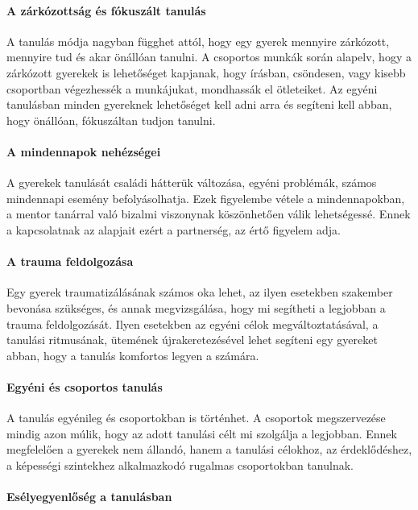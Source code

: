 \paragraph{A zárkózottság és fókuszált
tanulás}

A tanulás módja nagyban függhet attól, hogy egy gyerek mennyire
zárkózott, mennyire tud és akar önállóan tanulni. A csoportos munkák
során alapelv, hogy a zárkózott gyerekek is lehetőséget kapjanak, hogy
írásban, csöndesen, vagy kisebb csoportban végezhessék a munkájukat,
mondhassák el ötleteiket. Az egyéni tanulásban minden gyereknek
lehetőséget kell adni arra és segíteni kell abban, hogy önállóan,
fókuszáltan tudjon tanulni.

\paragraph{A mindennapok
nehézségei}

A gyerekek tanulását családi hátterük változása, egyéni problémák,
számos mindennapi esemény befolyásolhatja. Ezek figyelembe vétele a
mindennapokban, a mentor tanárral való bizalmi viszonynak köszönhetően
válik lehetségessé. Ennek a kapcsolatnak az alapjait ezért a partnerség,
az értő figyelem adja.

\paragraph{A trauma feldolgozása}

Egy gyerek traumatizálásának számos oka lehet, az ilyen esetekben
szakember bevonása szükséges, és annak megvizsgálása, hogy mi segítheti
a legjobban a trauma feldolgozását. Ilyen esetekben az egyéni célok
megváltoztatásával, a tanulási ritmusának, ütemének újrakeretezésével
lehet segíteni egy gyereket abban, hogy a tanulás komfortos legyen a
számára.

\paragraph{Egyéni és csoportos
tanulás}

A tanulás egyénileg és csoportokban is történhet. A csoportok
megszervezése mindig azon múlik, hogy az adott tanulási célt mi
szolgálja a legjobban. Ennek megfelelően a gyerekek nem állandó, hanem a
tanulási célokhoz, az érdeklődéshez, a képességi szintekhez alkalmazkodó
rugalmas csoportokban tanulnak.

\paragraph{Esélyegyenlőség a
tanulásban}

